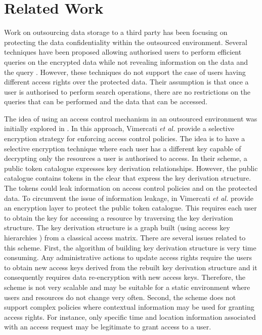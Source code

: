 \documentclass[final,5p,times,twocolumn]{elsarticle}
\begin{document}
\section{Related Work}
\label{sec:related-work}

Work on outsourcing data storage to a third party has been focusing on protecting the data confidentiality within the outsourced environment. Several techniques have been proposed allowing authorised users to perform efficient queries on the encrypted data while not revealing information on the data and the query \cite{Song2000, Boneh2004, Golle2004, Curtmola2006, Hwang2007, Boneh2007, Wang2008, Baek2008, Rhee2010, Shao2010, Dong2011}. However, these techniques do not support the case of users having different access rights over the protected data. Their assumption is that once a user is authorised to perform search operations, there are no restrictions on the queries that can be performed and the data that can be accessed.

The idea of using an access control mechanism in an outsourced environment was initially explored in \cite{Vimercati2007-2, Vimercati2007}. In this approach, Vimercati \emph{et al.} provide a selective encryption strategy for enforcing access control policies. The idea is to have a selective encryption technique where each user has a different key capable of decrypting only the resources a user is authorised to access. In their scheme, a public token catalogue expresses key derivation relationships. However, the public catalogue contains tokens in the clear that express the key derivation structure. The tokens could leak information on access control policies and on the protected data. To circumvent the issue of information leakage, in \cite{Vimercati2008} Vimercati \emph{et al.} provide an encryption layer to protect the public token catalogue. This requires each user to obtain the key for accessing a resource by traversing the key derivation structure. The key derivation structure is a graph built (using access key hierarchies \cite{Atallah2009}) from a classical access matrix. There are several issues related to this scheme. First, the algorithm of building key derivation structure is very time consuming. Any administrative actions to update access rights require the users to obtain new access keys derived from the rebuilt key derivation structure and it consequently requires data re-encryption with new access keys. Therefore, the scheme is not very scalable and may be suitable for a static environment where users and resources do not change very often. Second, the scheme does not support complex policies where contextual information may be used for granting access rights. For instance, only specific time and location information associated with an access request may be legitimate to grant access to a user.
\end{document}
